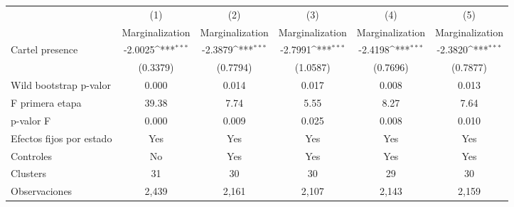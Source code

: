 {
\def\sym#1{\ifmmode^{#1}\else\(^{#1}\)\fi}
\begin{tabular}{l*{5}{c}}
\toprule
                    &\multicolumn{1}{c}{(1)}&\multicolumn{1}{c}{(2)}&\multicolumn{1}{c}{(3)}&\multicolumn{1}{c}{(4)}&\multicolumn{1}{c}{(5)}\\
                    &\multicolumn{1}{c}{Marginalization}&\multicolumn{1}{c}{Marginalization}&\multicolumn{1}{c}{Marginalization}&\multicolumn{1}{c}{Marginalization}&\multicolumn{1}{c}{Marginalization}\\
\midrule
Cartel presence     &     -2.0025\sym{***}&     -2.3879\sym{***}&     -2.7991\sym{***}&     -2.4198\sym{***}&     -2.3820\sym{***}\\
                    &    (0.3379)         &    (0.7794)         &    (1.0587)         &    (0.7696)         &    (0.7877)         \\
\midrule
Wild bootstrap p-valor&       0.000         &       0.014         &       0.017         &       0.008         &       0.013         \\
F primera etapa     &       39.38         &        7.74         &        5.55         &        8.27         &        7.64         \\
p-valor F           &       0.000         &       0.009         &       0.025         &       0.008         &       0.010         \\
Efectos fijos por estado&         Yes         &         Yes         &         Yes         &         Yes         &         Yes         \\
Controles           &          No         &         Yes         &         Yes         &         Yes         &         Yes         \\
Clusters            &          31         &          30         &          30         &          29         &          30         \\
Observaciones       &       2,439         &       2,161         &       2,107         &       2,143         &       2,159         \\
\bottomrule
\end{tabular}
}
